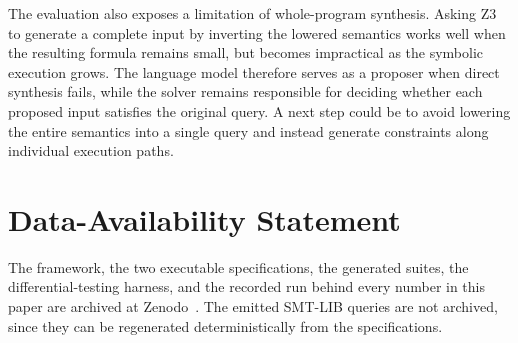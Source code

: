 \documentclass[sigconf,screen]{acmart}
\theoremstyle{definition}
\theoremstyle{remark}
\begin{document}
The evaluation also exposes a limitation of whole-program synthesis. Asking Z3 to generate a complete input by inverting the lowered semantics works well when the resulting formula remains small, but becomes impractical as the symbolic execution grows. The language model therefore serves as a proposer when direct synthesis fails, while the solver remains responsible for deciding whether each proposed input satisfies the original query. A next step could be to avoid lowering the entire semantics into a single query and instead generate constraints along individual execution paths.

\section*{Data-Availability Statement}
The framework, the two executable specifications, the generated suites, the
differential-testing harness, and the recorded run behind every number in this
paper are archived at Zenodo~\cite{rusmt-artifact}. The
emitted SMT-LIB queries are not archived, since they can be regenerated
deterministically from the specifications.




\end{document}
